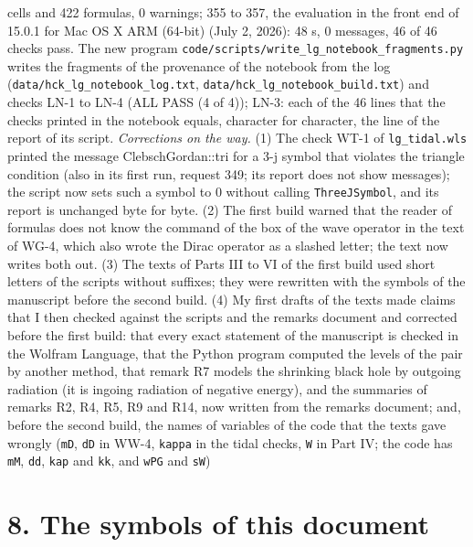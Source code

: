 \documentclass[
  10pt,
]{article}
\begin{document}
\begin{longtable}[]
cells and 422 formulas, 0 warnings; 355 to 357, the evaluation in the
front end of 15.0.1 for Mac OS X ARM (64-bit) (July 2, 2026): 48 s, 0
messages, 46 of 46 checks pass. The new program
\texttt{code/scripts/write\_lg\_notebook\_fragments.py} writes the
fragments of the provenance of the notebook from the log
(\texttt{data/hck\_lg\_notebook\_log.txt},
\texttt{data/hck\_lg\_notebook\_build.txt}) and checks LN-1 to LN-4 (ALL
PASS (4 of 4)); LN-3: each of the 46 lines that the checks printed in
the notebook equals, character for character, the line of the report of
its script. \emph{Corrections on the way.} (1) The check WT-1 of
\texttt{lg\_tidal.wls} printed the message ClebschGordan::tri for a 3-j
symbol that violates the triangle condition (also in its first run,
request 349; its report does not show messages); the script now sets
such a symbol to 0 without calling \texttt{ThreeJSymbol}, and its report
is unchanged byte for byte. (2) The first build warned that the reader
of formulas does not know the command of the box of the wave operator in
the text of WG-4, which also wrote the Dirac operator as a slashed
letter; the text now writes both out. (3) The texts of Parts III to VI
of the first build used short letters of the scripts without suffixes;
they were rewritten with the symbols of the manuscript before the second
build. (4) My first drafts of the texts made claims that I then checked
against the scripts and the remarks document and corrected before the
first build: that every exact statement of the manuscript is checked in
the Wolfram Language, that the Python program computed the levels of the
pair by another method, that remark R7 models the shrinking black hole
by outgoing radiation (it is ingoing radiation of negative energy), and
the summaries of remarks R2, R4, R5, R9 and R14, now written from the
remarks document; and, before the second build, the names of variables
of the code that the texts gave wrongly (\texttt{mD}, \texttt{dD} in
WW-4, \texttt{kappa} in the tidal checks, \texttt{W} in Part IV; the
code has \texttt{mM}, \texttt{dd}, \texttt{kap} and \texttt{kk}, and
\texttt{wPG} and \texttt{sW}) \\
\end{longtable}

\hypertarget{the-symbols-of-this-document}{%
\section{8. The symbols of this
document}\label{the-symbols-of-this-document}}
\end{document}
